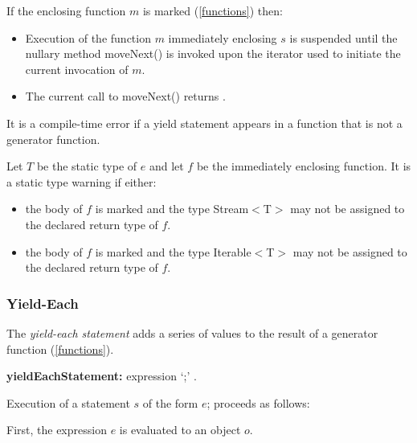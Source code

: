 \documentclass{article}
\newcommand{\code}[1]{{\sf #1}}
\begin{document}
\begin{itemize}
\LMHash{}
If the enclosing function $m$ is marked \SYNC* (\ref{functions}) then:
\begin{itemize}
\item
Execution of the function $m$ immediately enclosing $s$ is suspended until the nullary method \code{moveNext()} is invoked upon the iterator used to initiate the current invocation of $m$.
\item
The current call to \code{moveNext()} returns \TRUE.
\end{itemize}

\LMHash{}
It is a compile-time error if a yield statement appears in a function that is not a generator function.

\LMHash{}
Let $T$ be the static type of $e$ and let $f$ be the immediately enclosing function.  It is a static type warning if either:
\begin{itemize}
\item
 the body of $f$ is marked \ASYNC* and the type \code{Stream$<$T$>$} may not be assigned to the declared return type of $f$.
 \item
 the body of $f$ is marked \SYNC* and the type \code{Iterable$<$T$>$} may not be assigned to the declared return type of $f$.
 \end{itemize}


 \subsubsection{ Yield-Each}

\LMHash{}
 The {\em yield-each statement} adds a series of values to the result of a generator function (\ref{functions}).

 \begin{grammar}
{\bf yieldEachStatement:}
   \YIELD* expression `{\escapegrammar ;}'
      .
\end{grammar}

\LMHash{}
Execution of a statement $s$ of the form \code{\YIELD* $e$;}  proceeds as follows:

\LMHash{}
First, the expression $e$ is evaluated to an object $o$.


\end{itemize}
\end{document}
